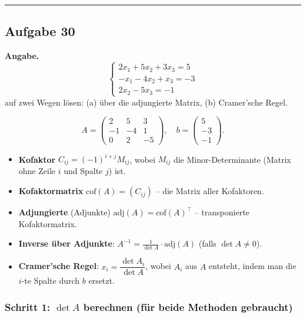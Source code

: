 \documentclass[a4paper,12pt]{article}
\begin{document}
\bigskip
\hrule
\bigskip

\subsection*{Aufgabe 30}

\textbf{Angabe.}
\[
\begin{cases} 2x_1 + 5x_2 + 3x_3 = 5 \\ -x_1 - 4x_2 + x_3 = -3 \\ 2x_2 - 5x_3 = -1 \end{cases}
\]
auf zwei Wegen l\"osen: (a) \"uber die adjungierte Matrix, (b) Cramer'sche Regel.

\[
A = \begin{pmatrix} 2 & 5 & 3 \\ -1 & -4 & 1 \\ 0 & 2 & -5 \end{pmatrix},\quad
b = \begin{pmatrix} 5 \\ -3 \\ -1 \end{pmatrix}.
\]

\begin{begriffe}
\begin{itemize}[leftmargin=*, nosep]
    \item \textbf{Kofaktor} $C_{ij} = (-1)^{i+j} M_{ij}$, wobei $M_{ij}$ die Minor-Determinante (Matrix ohne Zeile $i$ und Spalte $j$) ist.
    \item \textbf{Kofaktormatrix} $\text{cof}(A) = (C_{ij})$ -- die Matrix aller Kofaktoren.
    \item \textbf{Adjungierte} (Adjunkte) $\text{adj}(A) = \text{cof}(A)^\top$ -- transponierte Kofaktormatrix.
    \item \textbf{Inverse \"uber Adjunkte}: $A^{-1} = \tfrac{1}{\det A} \cdot \text{adj}(A)$ (falls $\det A \neq 0$).
    \item \textbf{Cramer'sche Regel}: $x_i = \dfrac{\det A_i}{\det A}$, wobei $A_i$ aus $A$ entsteht, indem man die $i$-te Spalte durch $b$ ersetzt.
\end{itemize}
\end{begriffe}

\subsubsection*{Schritt 1: $\det A$ berechnen (f\"ur beide Methoden gebraucht)}
\end{document}
